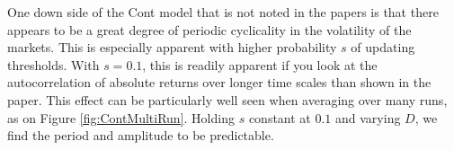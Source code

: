 \documentclass[runningheads]{llncs}
\begin{document}
One down side of the Cont model that is not noted in the papers is that there appears to be a great degree of periodic cyclicality in the volatility of the markets. This is especially apparent with higher probability $s$ of updating thresholds. With $s=0.1$, this is readily apparent if you look at the autocorrelation of absolute returns over longer time scales than shown in the paper. This effect can be particularly well seen when averaging over many runs, as on Figure \ref{fig:ContMultiRun}. Holding $s$ constant at $0.1$ and varying $D$, we find the period and amplitude to be predictable.

\begin{figure}[htbp]
  \begin{center}
   \mbox{
    \quad
{}
}
\end{center}
\end{figure}
\end{document}
